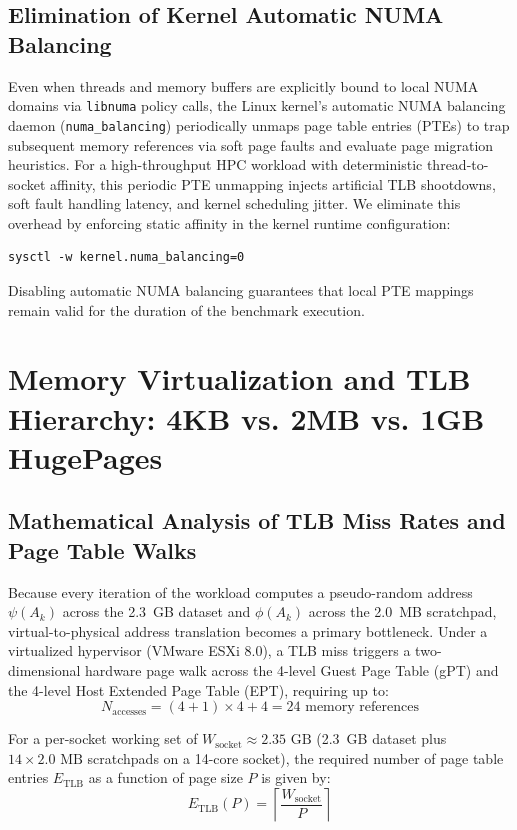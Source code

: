 \documentclass[journal]{IEEEtran}
\begin{document}
\subsection{Elimination of Kernel Automatic NUMA Balancing}
Even when threads and memory buffers are explicitly bound to local NUMA domains via \texttt{libnuma} policy calls, the Linux kernel's automatic NUMA balancing daemon (\texttt{numa\_balancing}) periodically unmaps page table entries (PTEs) to trap subsequent memory references via soft page faults and evaluate page migration heuristics. For a high-throughput HPC workload with deterministic thread-to-socket affinity, this periodic PTE unmapping injects artificial TLB shootdowns, soft fault handling latency, and kernel scheduling jitter. We eliminate this overhead by enforcing static affinity in the kernel runtime configuration:
\begin{verbatim}
sysctl -w kernel.numa_balancing=0
\end{verbatim}
Disabling automatic NUMA balancing guarantees that local PTE mappings remain valid for the duration of the benchmark execution.

\section{Memory Virtualization and TLB Hierarchy: 4KB vs. 2MB vs. 1GB HugePages}

\subsection{Mathematical Analysis of TLB Miss Rates and Page Table Walks}
Because every iteration of the workload computes a pseudo-random address $\psi(A_k)$ across the 2.3~GB dataset and $\phi(A_k)$ across the 2.0~MB scratchpad, virtual-to-physical address translation becomes a primary bottleneck. Under a virtualized hypervisor (VMware ESXi 8.0), a TLB miss triggers a two-dimensional hardware page walk across the 4-level Guest Page Table (gPT) and the 4-level Host Extended Page Table (EPT), requiring up to:
\begin{equation}
N_{\text{accesses}} = (4 + 1) \times 4 + 4 = 24\text{ memory references}
\end{equation}

For a per-socket working set of $W_{\text{socket}} \approx 2.35\text{ GB}$ (2.3~GB dataset plus $14 \times 2.0\text{ MB}$ scratchpads on a 14-core socket), the required number of page table entries $E_{\text{TLB}}$ as a function of page size $P$ is given by:
\begin{equation}
E_{\text{TLB}}(P) = \left\lceil \frac{W_{\text{socket}}}{P} \right\rceil
\end{equation}
\end{document}
